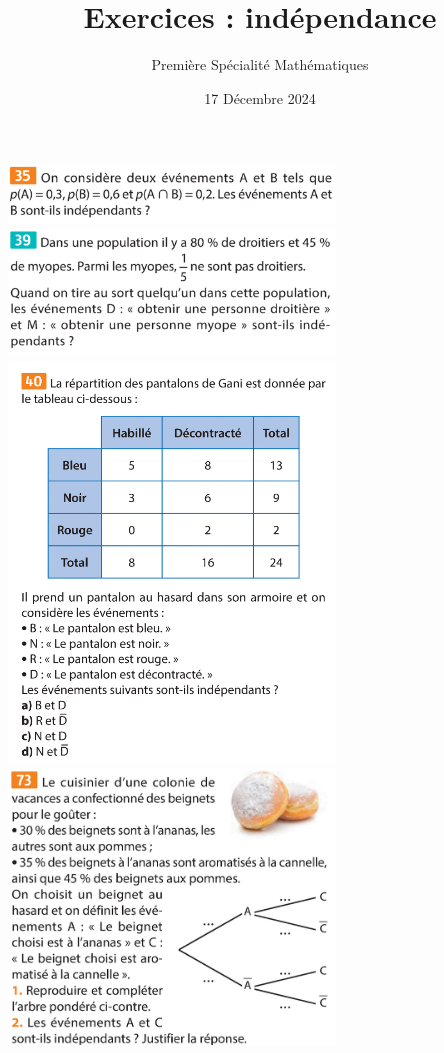 \documentclass{article}
\title{Exercices : indépendance}
\date{17 Décembre 2024}
\author{Première Spécialité Mathématiques}
\begin{document}
\maketitle

\begin{center}
\includegraphics[width=0.65\textwidth]{Exercice_2.png}
\includegraphics[width=0.65\textwidth]{Exercice_1.png}
\includegraphics[width=0.65\textwidth]{Exercice_3.png}
\includegraphics[width=0.65\textwidth]{Exercice_4.png}

\end{center}
\end{document}
